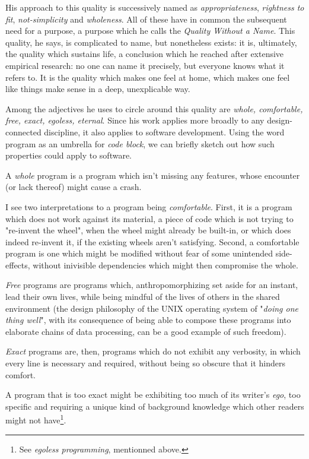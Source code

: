 \documentclass{article}
\begin{document}
His approach to this quality is successively named as \emph{appropriateness}, \emph{rightness to fit}, \emph{not-simplicity} and \emph{wholeness}. All of these have in common the subsequent need for a purpose, a purpose which he calls the \emph{Quality Without a Name}. This quality, he says, is complicated to name, but nonetheless exists: it is, ultimately, the quality which sustains life, a conclusion which he reached after extensive empirical research: no one can name it precisely, but everyone knows what it refers to. It is the quality which makes one feel at home, which makes one feel like things make sense in a deep, unexplicable way.

Among the adjectives he uses to circle around this quality are \emph{whole, comfortable, free, exact, egoless, eternal}. Since his work applies more broadly to any design-connected discipline, it also applies to software development. Using the word program as an umbrella for \emph{code block}, we can briefly sketch out how such properties could apply to software.

A \emph{whole} program is a program which isn't missing any features, whose encounter (or lack thereof) might cause a crash.

I see two interpretations to a program being \emph{comfortable}. First, it is a program which does not work against its material, a piece of code which is not trying to "re-invent the wheel", when the wheel might already be built-in, or which does indeed re-invent it, if the existing wheels aren't satisfying. Second, a comfortable program is one which might be modified without fear of some unintended side-effects, without inivisible dependencies which might then compromise the whole.

\emph{Free} programs are programs which, anthropomorphizing set aside for an instant, lead their own lives, while being mindful of the lives of others in the shared environment (the design philosophy of the UNIX operating system of "\emph{doing one thing well}", with its consequence of being able to compose these programs into elaborate chains of data processing, can be a good example of such freedom).

\emph{Exact} programs are, then, programs which do not exhibit any verbosity, in which every line is necessary and required, without being so obscure that it hinders comfort.

A program that is too exact might be exhibiting too much of its writer's \emph{ego}, too specific and requiring a unique kind of background knowledge which other readers might not have\footnote{See \emph{egoless programming}, mentionned above.}.
\end{document}
